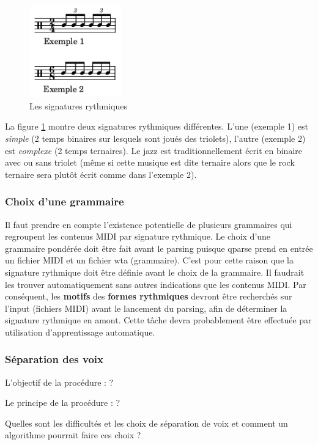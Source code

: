 \begin{figure}[h]
	\centering
	\includegraphics[height=40mm, width=40mm]{
    z_images/3_methodes/2_systemes/0_simple_VS_complexe.png}
	\caption{Les signatures rythmiques}
	\label{subdivisions}
\end{figure} %

La figure \ref{subdivisions} montre deux signatures rythmiques différentes. 
L’une (exemple 1) est \textit{simple} (2 temps binaires sur lesquels sont joués
des triolets), l’autre (exemple 2) est \textit{complexe} (2 temps ternaires). 
Le jazz est traditionnellement écrit en binaire avec ou sans triolet (même si
cette musique est dite ternaire alors que le rock ternaire sera plutôt écrit
comme dans l’exemple 2).

\subsubsection{Choix d’une grammaire}
Il faut prendre en compte l’existence potentielle de plusieurs grammaires
qui regroupent les contenus MIDI par signature rythmique. Le choix d’une
grammaire pondérée doit être fait avant le parsing puisque qparse prend en
entrée un fichier MIDI et un fichier wta (grammaire). C’est pour cette raison
que la signature rythmique doit être définie avant le choix de la grammaire.
Il faudrait les trouver automatiquement sans autres indications que les
contenus MIDI. Par conséquent, les \textbf{motifs} des
\textbf{formes rythmiques} devront être recherchés sur l’input (fichiers MIDI)
avant le lancement du parsing, afin de déterminer la signature rythmique en
amont. Cette tâche devra probablement être effectuée par utilisation
d'apprentissage automatique.


\subsubsection{Séparation des voix}

L’objectif de la procédure : ?

Le principe de la procédure : ?

Quelles sont les difficultés et les choix de séparation de voix et comment un
algorithme pourrait faire ces choix ?

